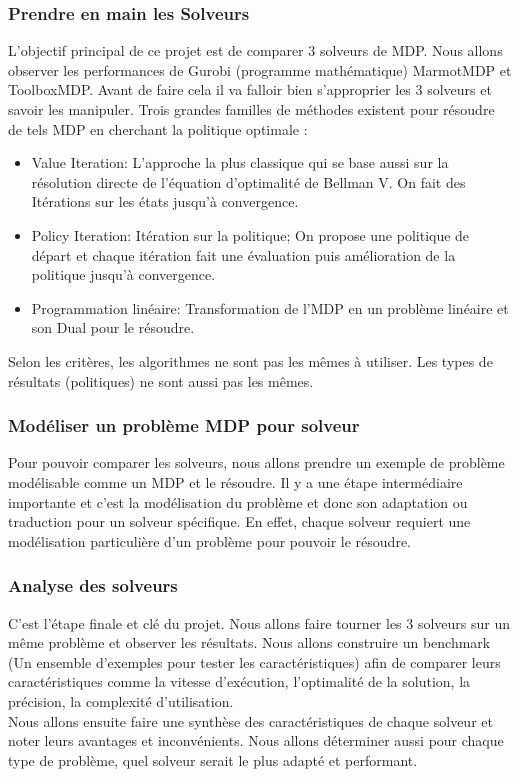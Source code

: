 \documentclass{article}
\begin{document}
\subsubsection{Prendre en main les Solveurs}
L'objectif principal de ce projet est de comparer 3 solveurs de MDP. Nous allons observer les performances de Gurobi (programme mathématique) MarmotMDP et ToolboxMDP. Avant de faire cela il va falloir bien s'approprier les 3 solveurs et savoir les manipuler. Trois grandes familles de méthodes existent pour résoudre de tels MDP en cherchant la politique optimale :

\begin{itemize}
    \item Value Iteration: L’approche la plus classique qui se base aussi sur la résolution directe de l’équation d’optimalité de Bellman V. On fait des Itérations sur les états jusqu'à convergence.
    \item Policy Iteration: Itération sur la politique; On propose une politique de départ et chaque itération fait une évaluation puis amélioration de la politique jusqu'à convergence.
    \item Programmation linéaire: Transformation de l’MDP en un problème linéaire et son Dual pour le résoudre.
\end{itemize}
Selon les critères, les algorithmes ne sont pas les mêmes à utiliser. Les types de résultats (politiques) ne sont aussi pas les mêmes.

\subsubsection{Modéliser un problème MDP pour solveur}
Pour pouvoir comparer les solveurs, nous allons prendre un exemple de problème modélisable comme un MDP et le résoudre. Il y a une étape intermédiaire importante et c’est la modélisation du problème et donc son adaptation ou traduction pour un solveur spécifique. En effet, chaque solveur requiert une modélisation particulière d’un problème pour pouvoir le résoudre.

\subsubsection{Analyse des solveurs}
C’est l’étape finale et clé du projet. Nous allons faire tourner les 3 solveurs sur un même problème et observer les résultats. Nous allons construire un benchmark (Un ensemble d'exemples pour tester les caractéristiques) afin de comparer leurs caractéristiques comme la vitesse d'exécution, l’optimalité de la solution, la précision, la complexité d’utilisation.\\
Nous allons ensuite faire une synthèse des caractéristiques de chaque solveur et noter leurs avantages et inconvénients. Nous allons déterminer aussi pour chaque type de problème, quel solveur serait le plus adapté et performant.
\end{document}
